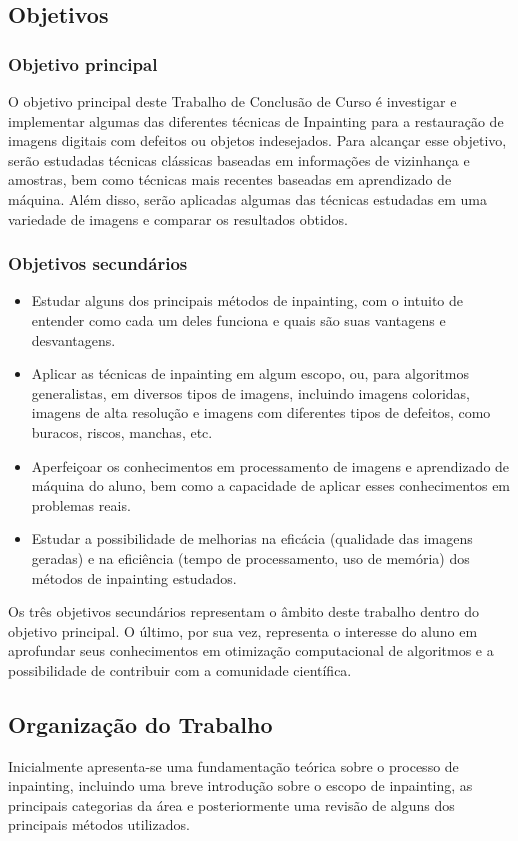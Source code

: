 \subsection{Objetivos}

\subsubsection{Objetivo principal}
O objetivo principal deste Trabalho de Conclusão de Curso é investigar e implementar algumas das diferentes técnicas de Inpainting para a restauração de imagens digitais com defeitos ou objetos indesejados. Para alcançar esse objetivo, serão estudadas técnicas clássicas baseadas em informações de vizinhança e amostras, bem como técnicas mais recentes baseadas em aprendizado de máquina. Além disso, serão aplicadas algumas das técnicas estudadas em uma variedade de imagens e comparar os resultados obtidos.

\subsubsection{Objetivos secundários}
\begin{itemize}
  \item Estudar alguns dos principais métodos de inpainting, com o intuito de entender como cada um deles funciona e quais são suas vantagens e desvantagens.
  \item Aplicar as técnicas de inpainting em algum escopo, ou, para algoritmos generalistas, em diversos tipos de imagens, incluindo imagens coloridas, imagens de alta resolução e imagens com diferentes tipos de defeitos, como buracos, riscos, manchas, etc.
  \item Aperfeiçoar os conhecimentos em processamento de imagens e aprendizado de máquina do aluno, bem como a capacidade de aplicar esses conhecimentos em problemas reais.
  \item Estudar a possibilidade de melhorias na eficácia (qualidade das imagens geradas) e na eficiência (tempo de processamento, uso de memória) dos métodos de inpainting estudados.
\end{itemize}

Os três objetivos secundários representam o âmbito deste trabalho dentro do objetivo principal. O último, por sua vez, representa o interesse do aluno em aprofundar seus conhecimentos em otimização computacional de algoritmos e a possibilidade de contribuir com a comunidade científica.

\subsection{Organização do Trabalho}
Inicialmente apresenta-se uma fundamentação teórica sobre o processo de inpainting, incluindo uma breve introdução sobre o escopo de inpainting, as principais categorias da área e posteriormente uma revisão de alguns dos principais métodos utilizados.

